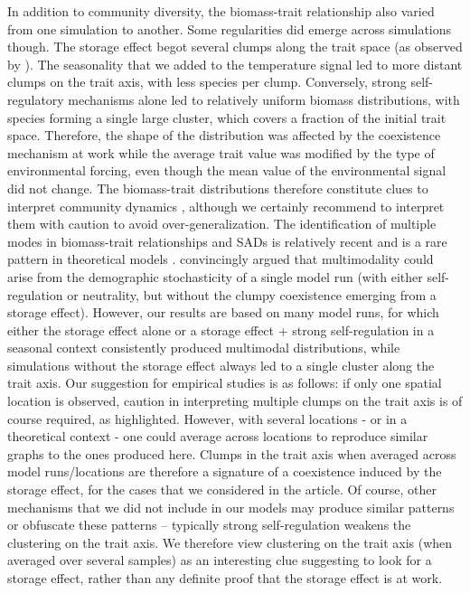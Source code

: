 \documentclass[a4paper,12pt]{article}
\begin{document}
In addition to community diversity, the biomass-trait relationship
also varied from one simulation to another. Some regularities did
emerge across simulations though. The storage effect begot several
clumps along the trait space (as observed by \citealp{scranton_coexistence_2016}).
The seasonality that we added to the temperature signal led to more
distant clumps on the trait axis, with less species per clump. Conversely,
strong self-regulatory mechanisms alone led to relatively uniform
biomass distributions, with species forming a single large cluster,
which covers a fraction of the initial trait space. Therefore, the
shape of the distribution was affected by the coexistence mechanism
at work while the average trait value was modified by the type of
environmental forcing, even though the mean value of the environmental
signal did not change. The biomass-trait distributions therefore constitute
clues to interpret community dynamics \citep{dandrea_challenges_2016,loranger_what_2018},
although we certainly recommend to interpret them with caution to
avoid over-generalization. The identification of multiple modes in
biomass-trait relationships and SADs is relatively recent \citep{dornelas_multiple_2008,matthews_multimodal_2014}
and is a rare pattern in theoretical models \citep{mcgill_species_2007}.
\citet{barabas_emergent_2013} convincingly argued that multimodality
could arise from the demographic stochasticity of a single model run
(with either self-regulation or neutrality, but without the clumpy
coexistence emerging from a storage effect). However, our results
are based on many model runs, for which either the storage effect
alone or a storage effect + strong self-regulation in a seasonal context
consistently produced multimodal distributions, while simulations
without the storage effect always led to a single cluster along the
trait axis. Our suggestion for empirical studies is as follows: if
only one spatial location is observed, caution in interpreting multiple
clumps on the trait axis is of course required, as \citet{barabas_emergent_2013}
highlighted. However, with several locations - or in a theoretical
context - one could average across locations to reproduce similar
graphs to the ones produced here. Clumps in the trait axis when averaged
across model runs/locations are therefore a signature of a coexistence
induced by the storage effect, for the cases that we considered in
the article. Of course, other mechanisms that we did not include in
our models may produce similar patterns \citep{rael2018emergent}
or obfuscate these patterns -- typically strong self-regulation weakens
the clustering on the trait axis. We therefore view clustering on
the trait axis (when averaged over several samples) as an interesting
clue suggesting to look for a storage effect, rather than any definite
proof that the storage effect is at work. 
\end{document}
